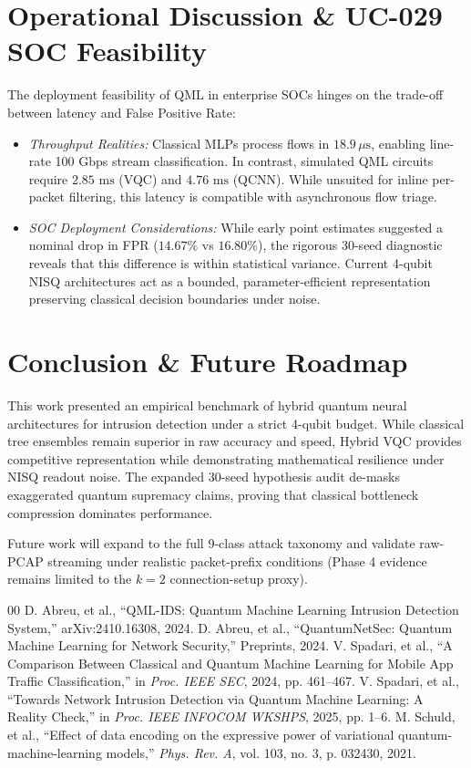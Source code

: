\documentclass[conference]{IEEEtran}
\begin{document}
\section{Operational Discussion \& UC-029 SOC Feasibility}
The deployment feasibility of QML in enterprise SOCs hinges on the trade-off between latency and False Positive Rate:
\begin{itemize}
    \item \textit{Throughput Realities:} Classical MLPs process flows in $18.9\,\mu\text{s}$, enabling line-rate 100 Gbps stream classification. In contrast, simulated QML circuits require $2.85\text{ ms}$ (VQC) and $4.76\text{ ms}$ (QCNN). While unsuited for inline per-packet filtering, this latency is compatible with asynchronous flow triage.
    \item \textit{SOC Deployment Considerations:} While early point estimates suggested a nominal drop in FPR ($14.67\%$ vs $16.80\%$), the rigorous 30-seed diagnostic reveals that this difference is within statistical variance. Current 4-qubit NISQ architectures act as a bounded, parameter-efficient representation preserving classical decision boundaries under noise.
\end{itemize}

\section{Conclusion \& Future Roadmap}
This work presented an empirical benchmark of hybrid quantum neural architectures for intrusion detection under a strict 4-qubit budget. While classical tree ensembles remain superior in raw accuracy and speed, Hybrid VQC provides competitive representation while demonstrating mathematical resilience under NISQ readout noise. The expanded 30-seed hypothesis audit de-masks exaggerated quantum supremacy claims, proving that classical bottleneck compression dominates performance.

Future work will expand to the full 9-class attack taxonomy and validate raw-PCAP streaming under realistic packet-prefix conditions (Phase 4 evidence remains limited to the $k=2$ connection-setup proxy).


\begin{thebibliography}{00}
 D. Abreu, et al., ``QML-IDS: Quantum Machine Learning Intrusion Detection System,'' arXiv:2410.16308, 2024.
 D. Abreu, et al., ``QuantumNetSec: Quantum Machine Learning for Network Security,'' Preprints, 2024.
 V. Spadari, et al., ``A Comparison Between Classical and Quantum Machine Learning for Mobile App Traffic Classification,'' in \textit{Proc. IEEE SEC}, 2024, pp. 461--467.
 V. Spadari, et al., ``Towards Network Intrusion Detection via Quantum Machine Learning: A Reality Check,'' in \textit{Proc. IEEE INFOCOM WKSHPS}, 2025, pp. 1--6.
 M. Schuld, et al., ``Effect of data encoding on the expressive power of variational quantum-machine-learning models,'' \textit{Phys. Rev. A}, vol. 103, no. 3, p. 032430, 2021.
\end{thebibliography}
\end{document}
